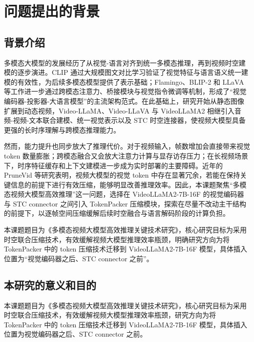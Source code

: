 \section{问题提出的背景}

\subsection{背景介绍}

多模态大模型的发展经历了从视觉-语言对齐到统一多模态推理，再到视频时空建模的逐步演进。CLIP 通过大规模图文对比学习验证了视觉特征与语言语义统一建模的有效性，为后续多模态模型提供了表示基础\cite{clip2021}；Flamingo、BLIP-2 和 LLaVA 等工作进一步通过跨模态注意力、桥接模块与视觉指令微调等机制，形成了“视觉编码器-投影器-大语言模型”的主流架构范式\cite{flamingo2022,blip22023,llava2023}。在此基础上，研究开始从静态图像扩展到动态视频，Video-LLaMA、Video-LLaVA 与 VideoLLaMA2 相继引入音频-视频-文本联合建模、统一视觉表示以及 STC 时空连接器，使视频大模型具备更强的长时序理解与跨模态推理能力\cite{videollama2023,videollava2023,videollama22024}。

然而，能力提升也同步放大了推理代价。对于视频输入，帧数增加会直接带来视觉 token 数量膨胀；跨模态融合又会放大注意力计算与显存访存压力；在长视频场景下，时序特征缓存和上下文建模进一步成为实时部署的主要障碍\cite{llamavid2024,longvlm2024}。近年的 PruneVid 等研究表明，视频大模型的视觉 token 中存在显著冗余，若能在保持关键信息的前提下进行有效压缩，能够明显改善推理效率\cite{prunevid2024}。因此，本课题聚焦“多模态视频大模型高效推理”这一问题，选择在 VideoLLaMA2-7B-16F 的视觉编码器与 STC connector 之间引入 TokenPacker 压缩模块，探索在尽量不改动主干结构的前提下，以逐帧空间压缩缓解后续时空融合与语言解码阶段的计算负担\cite{tokenpacker2024,videollama22024}。

本课题题目为《多模态视频大模型高效推理关键技术研究》，核心研究目标为采用时空联合压缩技术，有效缓解视频大模型推理效率瓶颈，明确研究方向为将 TokenPacker 中的 token 压缩技术迁移到 VideoLLaMA2-7B-16F 模型，具体插入位置为“视觉编码器之后、STC connector 之前”。

\subsection{本研究的意义和目的}

本课题题目为《多模态视频大模型高效推理关键技术研究》，核心研究目标为采用时空联合压缩技术，有效缓解视频大模型推理效率瓶颈，研究方向为将 TokenPacker 中的 token 压缩技术迁移到 VideoLLaMA2-7B-16F 模型，具体插入位置为视觉编码器之后、STC connector 之前。


